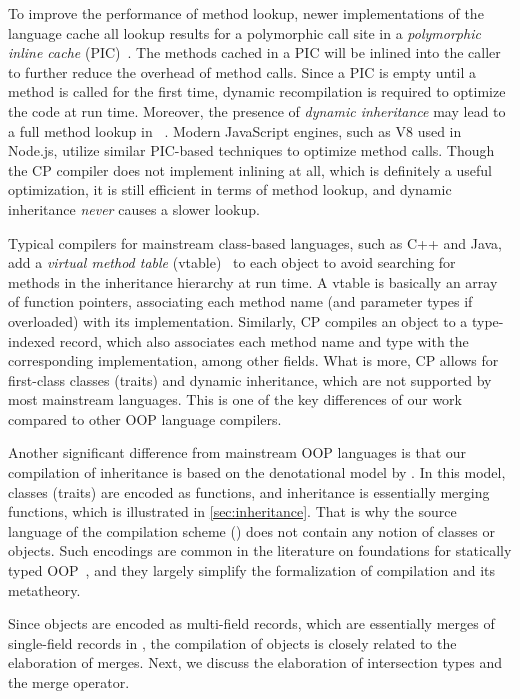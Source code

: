 To improve the performance of method lookup, newer implementations of the
\self language cache all lookup results for a polymorphic call site in a
\emph{polymorphic inline cache} (PIC)~\citep{holzle1991optimizing}. The methods
cached in a PIC will be inlined into the caller to further reduce the overhead
of method calls. Since a PIC is empty until a method is called for the first
time, dynamic recompilation is required to optimize the code at run time.
Moreover, the presence of \emph{dynamic inheritance} may lead to a full method
lookup in \self~\citep{chambers1992design}. Modern JavaScript engines,
such as V8 used in Node.js, utilize similar PIC-based techniques to optimize
method calls. Though the CP compiler does not implement inlining at all, which
is definitely a useful optimization, it is still efficient in terms of method
lookup, and dynamic inheritance \emph{never} causes a slower lookup.

Typical compilers for mainstream class-based languages, such as C++ and Java,
add a \emph{virtual method table} (vtable)~\citep{driesen1995message} to each
object to avoid searching for methods in the inheritance hierarchy at run time.
A vtable is basically an array of function pointers, associating each method
name (and parameter types if overloaded) with its implementation. Similarly, CP
compiles an object to a type-indexed record, which also associates each method
name and type with the corresponding implementation, among other fields. What is
more, CP allows for first-class classes (traits) and dynamic inheritance, which
are not supported by most mainstream languages. This is one of the key
differences of our work compared to other OOP language compilers.

Another significant difference from mainstream OOP languages is that our
compilation of inheritance is based on the denotational model by
\citet{cook1989denotational}. In this model, classes (traits) are encoded as
functions, and inheritance is essentially merging functions, which is
illustrated in \autoref{sec:inheritance}. That is why the source language of the
compilation scheme (\lambdaiplus) does not contain any notion of classes or
objects. Such encodings are common in the literature on foundations for
statically typed
OOP~\citep{bruce1999comparing,bruce2002foundations,pierce2002types}, and they
largely simplify the formalization of compilation and its metatheory.

Since objects are encoded as multi-field records, which are essentially merges
of single-field records in \lambdaiplus, the compilation of objects is closely
related to the elaboration of merges. Next, we discuss the elaboration of
intersection types and the merge operator.

